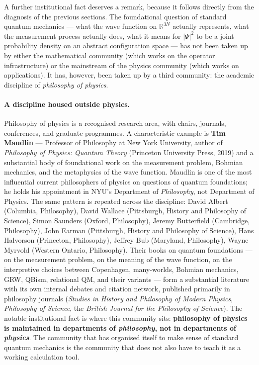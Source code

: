 A further institutional fact deserves a remark, because it follows directly from the diagnosis of the previous sections. The foundational question of standard quantum mechanics --- what the wave function on $\mathbb{R}^{3N}$ actually represents, what the measurement process actually does, what it means for $|\Psi|^2$ to be a joint probability density on an abstract configuration space --- has not been taken up by either the mathematical community (which works on the operator infrastructure) or the mainstream of the physics community (which works on applications). It has, however, been taken up by a third community: the academic discipline of \emph{philosophy of physics}.

\paragraph{A discipline housed outside physics.}
Philosophy of physics is a recognised research area, with chairs, journals, conferences, and graduate programmes. A characteristic example is \textbf{Tim Maudlin} --- Professor of Philosophy at New York University, author of \emph{Philosophy of Physics: Quantum Theory} (Princeton University Press, 2019) and a substantial body of foundational work on the measurement problem, Bohmian mechanics, and the metaphysics of the wave function. Maudlin is one of the most influential current philosophers of physics on questions of quantum foundations; he holds his appointment in NYU's Department of \emph{Philosophy}, not Department of Physics. The same pattern is repeated across the discipline: David Albert (Columbia, Philosophy), David Wallace (Pittsburgh, History and Philosophy of Science), Simon Saunders (Oxford, Philosophy), Jeremy Butterfield (Cambridge, Philosophy), John Earman (Pittsburgh, History and Philosophy of Science), Hans Halvorson (Princeton, Philosophy), Jeffrey Bub (Maryland, Philosophy), Wayne Myrvold (Western Ontario, Philosophy). Their books on quantum foundations --- on the measurement problem, on the meaning of the wave function, on the interpretive choices between Copenhagen, many-worlds, Bohmian mechanics, GRW, QBism, relational QM, and their variants --- form a substantial literature with its own internal debates and citation network, published primarily in philosophy journals (\emph{Studies in History and Philosophy of Modern Physics}, \emph{Philosophy of Science}, the \emph{British Journal for the Philosophy of Science}). The notable institutional fact is where this community sits: \textbf{philosophy of physics is maintained in departments of \emph{philosophy}, not in departments of \emph{physics}}. The community that has organised itself to make sense of standard quantum mechanics is the community that does not also have to teach it as a working calculation tool.

